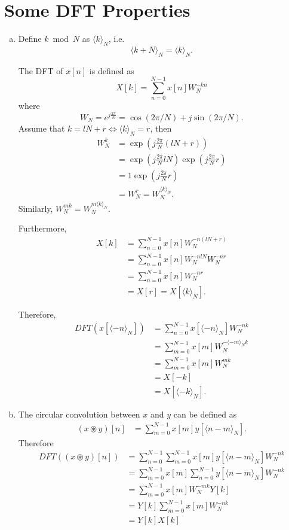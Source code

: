 \section{Some DFT Properties}\label{sec:p5}

\begin{enumerate}[(a)]
\item Define $k \bmod N$ as $\langle k \rangle_N$, i.e.
\[\langle k + N \rangle_N = \langle k \rangle_N.\]

The DFT of $x[n]$ is defined as
\[X[k] = \sum_{n=0}^{N-1} x[n] W_N^{-kn}\]
where
\[W_N = e^{j\frac{2\pi}{N}} = \cos(2\pi/N) + j\sin(2\pi /N).\]
Assume that $k = lN+r \Leftrightarrow \langle k \rangle_N = r$, then
\begin{align*}
	W_N^k
	&= \exp(j \frac{2\pi}{N} (lN+r)) \\
	&= \exp(j \frac{2\pi}{N} lN) \exp(j \frac{2\pi}{N} r) \\
	&= 1 \exp(j \frac{2\pi}{N} r) \\
	&= W_N^r = W_N^{\langle k \rangle_N}.
\end{align*}
Similarly, $W_N^{mk} = W_N^{m \langle k \rangle_N}$.

Furthermore, 
\begin{align*}
	X[k]
	&= \sum_{n=0}^{N-1}x[n] W_N^{-n(lN+r)} \\
	&= \sum_{n=0}^{N-1} x[n] W_N^{-nlN} W_N^{-nr} \\
	&= \sum_{n=0}^{N-1} x[n] W_N^{-nr} \\
	&= X[r] = X[\langle k \rangle_N].
\end{align*}

Therefore,
\begin{align*}
	DFT(x[\langle -n \rangle_N])
	&= \sum_{n=0}^{N-1}x[\langle -n \rangle_N] W_N^{-nk} \\
	&= \sum_{m=0}^{N-1} x[m] W_N^{-\langle -m\rangle_N k} \\
	&= \sum_{m=0}^{N-1} x[m] W_N^{mk} \\
	&= X[-k] \\
	&= X[\langle -k \rangle_N].
\end{align*}

\item The circular convolution between $x$ and $y$ can be defined as
\begin{align*}
	(x \circledast y)[n] 
	&= \sum_{m=0}^{N-1} x[m] y[\langle n - m\rangle_N].
\end{align*}
Therefore
\begin{align*}
	DFT((x \circledast y)[n])
	&= \sum_{n=0}^{N-1} \sum_{m=0}^{N-1} x[m] y[\langle n-m\rangle_N] W_N^{-nk} \\
	&= \sum_{m=0}^{N-1} x[m] \sum_{n=0}^{N-1} y[\langle n-m \rangle_N]W_N^{-nk} \\
	&= \sum_{m=0}^{N-1} x[m] W_N^{-mk} Y[k] \\
	&= Y[k] \sum_{m=0}^{N-1} x[m] W_N^{-nk} \\
	&= Y[k] X[k]
\end{align*}


\end{enumerate}
